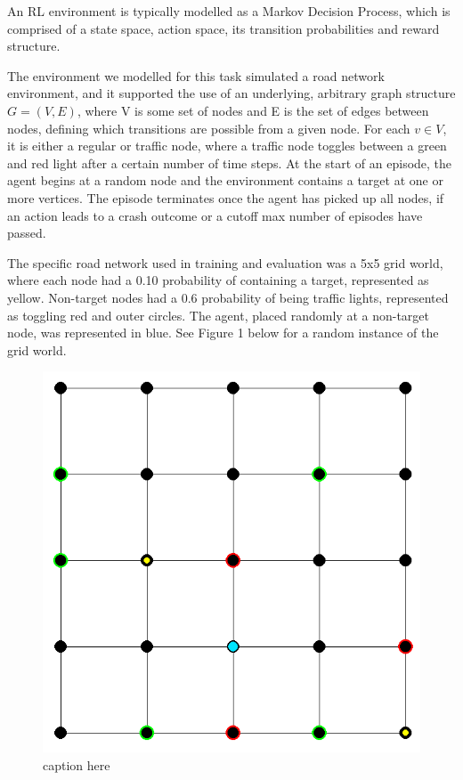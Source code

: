 \documentclass{article}
\begin{document}
        An RL environment is typically modelled as a Markov Decision Process, which is comprised of a state space, action space, its transition probabilities and reward structure.

        The environment we modelled for this task simulated a road network environment, and it supported the use of an underlying, arbitrary graph structure $G = (V, E)$, where V is some set of nodes and E is the set of edges between nodes, defining which transitions are possible from a given node. For each $v\in V$, it is either a regular or traffic node, where a traffic node toggles between a green and red light after a certain number of time steps. At the start of an episode, the agent begins at a random node and the environment contains a target at one or more vertices. The episode terminates once the agent has picked up all nodes, if an action leads to a crash outcome or a cutoff max number of episodes have passed.

        The specific road network used in training and evaluation was a 5x5 grid world, where each node had a 0.10 probability of containing a target, represented as yellow. Non-target nodes had a 0.6 probability of being traffic lights, represented as toggling red and outer circles. The agent, placed randomly at a non-target node, was represented in blue. See Figure 1 below for a random instance of the grid world.

        \begin{figure}[hbt!]
          \centering
          \includegraphics[scale=0.5]{grid-world.png}
          \caption{caption here}
          \label{fig:grid-world.png}
        \end{figure}
        \FloatBarrier 
\end{document}
